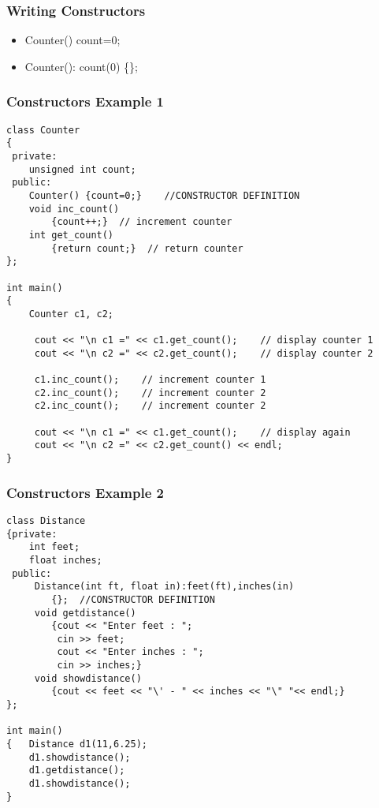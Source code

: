 \documentclass{beamer}
\newtheorem{Key points}{Key points}
\newcommand\Fontvi{\fontsize{5}{6.2}\selectfont}
\begin{document}
\begin{frame}[fragile]
\frametitle{Writing Constructors}
\begin{itemize}
\item<1> Counter() {count=0;}
\item<2-> Counter(): count(0) \{\}; 
\end{itemize}
\end{frame}
\begin{frame}[fragile]
\frametitle{Constructors Example 1}
\Fontvi
\begin{lstlisting}
class Counter
{
 private:
	unsigned int count;
 public:
	Counter() {count=0;}    //CONSTRUCTOR DEFINITION
	void inc_count()
		{count++;}  // increment counter
	int get_count()
		{return count;}  // return counter
};

int main()
{
	Counter c1, c2;
	
	 cout << "\n c1 =" << c1.get_count();    // display counter 1
	 cout << "\n c2 =" << c2.get_count();    // display counter 2 

	 c1.inc_count();    // increment counter 1
	 c2.inc_count();    // increment counter 2
	 c2.inc_count();    // increment counter 2

	 cout << "\n c1 =" << c1.get_count();    // display again
	 cout << "\n c2 =" << c2.get_count() << endl;
}
\end{lstlisting}
\end{frame}
\begin{frame}[fragile]
\frametitle{Constructors Example 2}
\Fontvi
\begin{lstlisting}
class Distance
{private:
	int feet;
	float inches;
 public:
	 Distance(int ft, float in):feet(ft),inches(in) 
		{};  //CONSTRUCTOR DEFINITION
	 void getdistance()
		{cout << "Enter feet : "; 
		 cin >> feet;
		 cout << "Enter inches : "; 
		 cin >> inches;}
	 void showdistance()
		{cout << feet << "\' - " << inches << "\" "<< endl;}
};

int main()
{	Distance d1(11,6.25);
 	d1.showdistance();
	d1.getdistance();
	d1.showdistance();
}
\end{lstlisting}
\end{frame}
\end{document}
